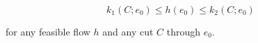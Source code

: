 $$k_1(C; e_0) \leq h(e_0) \leq k_2(C; e_0)$$

for any feasible flow $h$ and any cut $C$ through $e_0$.
